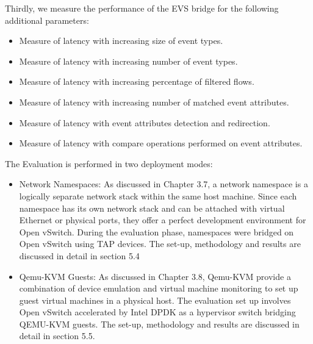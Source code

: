 Thirdly, we measure the performance of the EVS bridge for the following additional parameters:
\begin{itemize}
	\item Measure of latency with increasing size of event types.
	\item Measure of latency with increasing number of event types.
	\item Measure of latency with increasing percentage of filtered flows.
	\item Measure of latency with increasing number of matched event attributes. 
	\item Measure of latency with event attributes detection and redirection.
	\item Measure of latency with compare operations performed on event attributes.
\end{itemize}

The Evaluation is performed in two deployment modes:
\begin{itemize}
	\item Network Namespaces: As discussed in Chapter 3.7, a network namespace is a logically separate network stack within the same host machine. Since each namespace has its own network stack and can be attached with virtual Ethernet or physical ports, they offer a perfect development environment for Open vSwitch. During the evaluation phase, namespaces were bridged on Open vSwitch using TAP devices. The set-up, methodology and results are discussed in detail in section 5.4
	\item Qemu-KVM Guests: As discussed in Chapter 3.8, Qemu-KVM provide a combination of device emulation and virtual machine monitoring to set up guest virtual machines in a physical host. The evaluation set up involves Open vSwitch accelerated by Intel DPDK as a hypervisor switch bridging QEMU-KVM guests. The set-up, methodology and results are discussed in detail in section 5.5.
\end{itemize}


